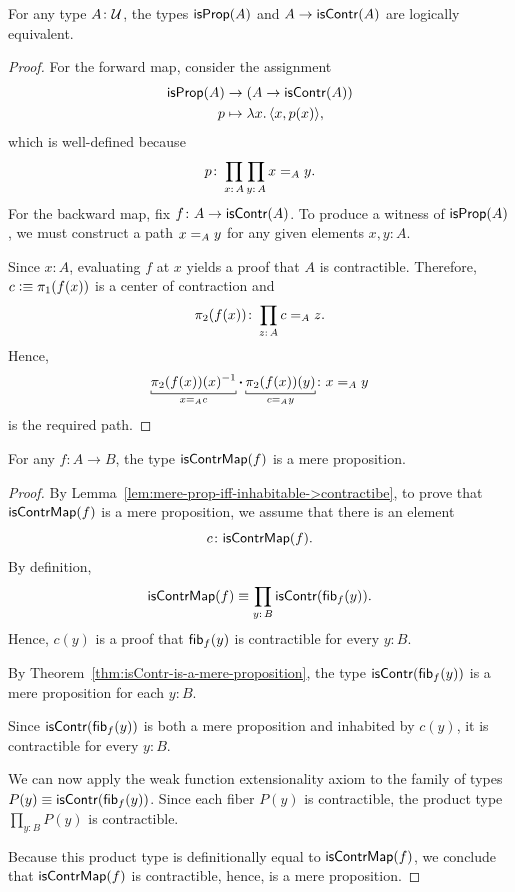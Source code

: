 \begin{lem}\label{lem:mere-prop-iff-inhabitable->contractibe}
    For any type\/ $A\colon\univ$, the types\/ $\mathsf{isProp}(A)$ and\/ $A\to\mathsf{isContr}(A)$ are logically equivalent.
\end{lem}

\begin{proof}
    For the forward map, consider the assignment
    \begin{align*}
        \mathsf{isProp}(A)&\to(A\to\mathsf{isContr}(A))\\
        p&\mapsto\lambda x.\,\langle x,p(x)\rangle,
    \end{align*}
    which is well-defined because
    \[
        p\colon\prod_{x\colon A}\prod_{y\colon A}x\eq Ay.
    \]
    For the backward map, fix $f\colon A\to\fun{isContr}(A)$. To produce a witness of $\mathsf{isProp}(A)$, we must construct a path $x\mathrel{=_{A}}y$ for any given elements $x,y\colon A$. 
    
    Since $x\colon A$, evaluating $f$ at $x$ yields a proof that $A$ is contractible. Therefore, $c\mathrel{\vcentcolon}\equiv\pi_1(f(x))$ is a center of contraction and
    \[
        \pi_2(f(x))\colon\prod_{z\colon A}c\eq Az.
    \]
    Hence,
    \[
        \explain[x\eq Ac]{\pi_2(f(x))(x)^{-1}}
        \ct
        \explain[c\eq Ay]{\pi_2(f(x))(y)}\colon x\eq Ay
    \]
    is the required path.
\end{proof}

\begin{lem}\we\label{lem:isContrMap-is-mere-proposition}
    For any\/ $f\colon A\to B$, the type\/ $\mathsf{isContrMap}(f)$ is a mere proposition.
\end{lem}

\begin{proof}
    By Lemma~\ref{lem:mere-prop-iff-inhabitable->contractibe}, to prove that $\mathsf{isContrMap}(f)$ is a mere proposition, we assume that there is an element
    \[
        c\colon\fun{isContrMap}(f).
    \]
    By definition,
    \[
        \fun{isContrMap}(f)\equiv\prod_{y\colon B}\fun{isContr}(\fun{fib}_f(y)).
    \]
    Hence, $c(y)$ is a proof that $\mathsf{fib}_f(y)$ is contractible for every $y\colon B$. 
    
    By Theorem~\ref{thm:isContr-is-a-mere-proposition}, the type $\mathsf{isContr}(\mathsf{fib}_f(y))$ is a mere proposition for each $y\colon B$. 
    
    Since $\mathsf{isContr}(\mathsf{fib}_f(y))$ is both a mere proposition and inhabited by $c(y)$, it is contractible for every $y\colon B$. 
    
    We can now apply the weak function extensionality axiom to the family of types $P(y)\equiv\mathsf{isContr}(\mathsf{fib}_f(y))$. Since each fiber $P(y)$ is contractible, the product type $\prod_{y\colon B}P(y)$ is contractible.
    
    Because this product type is definitionally equal to $\mathsf{isContrMap}(f)$, we conclude that $\mathsf{isContrMap}(f)$ is contractible, hence, is a mere proposition.
    
\end{proof}

